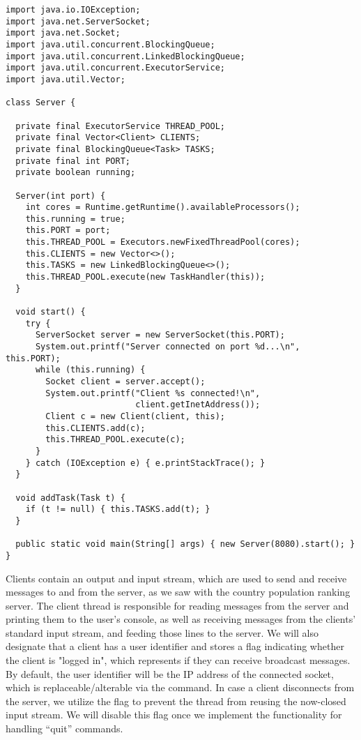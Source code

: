 \newpage
\begin{lstlisting}[language=MyJava]
import java.io.IOException;
import java.net.ServerSocket;
import java.net.Socket;
import java.util.concurrent.BlockingQueue;
import java.util.concurrent.LinkedBlockingQueue;
import java.util.concurrent.ExecutorService;
import java.util.Vector;

class Server {

  private final ExecutorService THREAD_POOL;
  private final Vector<Client> CLIENTS;
  private final BlockingQueue<Task> TASKS;
  private final int PORT;
  private boolean running;

  Server(int port) {
    int cores = Runtime.getRuntime().availableProcessors();
    this.running = true;
    this.PORT = port;
    this.THREAD_POOL = Executors.newFixedThreadPool(cores);
    this.CLIENTS = new Vector<>();
    this.TASKS = new LinkedBlockingQueue<>();
    this.THREAD_POOL.execute(new TaskHandler(this));
  }

  void start() {
    try {
      ServerSocket server = new ServerSocket(this.PORT);
      System.out.printf("Server connected on port %d...\n", this.PORT);
      while (this.running) {
        Socket client = server.accept();
        System.out.printf("Client %s connected!\n", 
                          client.getInetAddress());
        Client c = new Client(client, this);
        this.CLIENTS.add(c);
        this.THREAD_POOL.execute(c);
      }
    } catch (IOException e) { e.printStackTrace(); }
  }

  void addTask(Task t) {
    if (t != null) { this.TASKS.add(t); }
  }

  public static void main(String[] args) { new Server(8080).start(); }
}
\end{lstlisting}

Clients contain an output and input stream, which are used to send and receive messages to and from the server, as we saw with the country population ranking server. 
The client thread is responsible for reading messages from the server and printing them to the user's console, as well as receiving messages from the clients' standard input stream, and feeding those lines to the server. 
We will also designate that a client has a user identifier and stores a flag indicating whether the client is "logged in", which represents if they can receive broadcast messages. 
By default, the user identifier will be the IP address of the connected socket, which is replaceable/alterable via the  command. 
In case a client disconnects from the server, we utilize the  flag to prevent the thread from reusing the now-closed input stream. 
We will disable this flag once we implement the functionality for handling ``quit'' commands.

